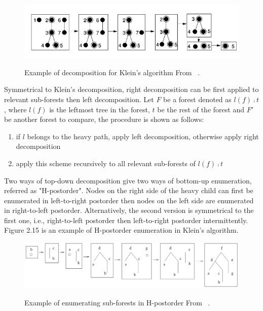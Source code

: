 \begin{figure}
		\centering
		\includegraphics[width=12cm,clip]{Figures/KleinAlgorithmExample}
		\label{Example of Decomposition for Klein's Algorithm} 
		\caption{Example of decomposition for Klein's algorithm From ~\cite{klein1998computing}.}
\end{figure}

Symmetrical to Klein's decomposition, right decomposition can be first applied to relevant sub-forests then left decomposition. Let $F$ be a forest denoted as $l(f) \comp t$, where $l(f)$ is the leftmost tree in the forest, $t$ be the rest of the forest and $F'$ be another forest to compare, the procedure is shown as follows:

\begin{enumerate}
\item if $l$ belongs to the heavy path, apply left decomposition, otherwise apply right decomposition
\item apply this scheme recursively to all relevant sub-forests of $l(f) \comp t$
\end{enumerate} 

Two ways of top-down decomposition give two ways of bottom-up enumeration, referred as  "H-postorder". Nodes on the right side of the heavy child can first be enumerated in left-to-right postorder then nodes on the left side are enumerated in right-to-left postorder. Alternatively, the second version is symmetrical to the first one, i.e., right-to-left postorder then left-to-right postorder intermittently. Figure 2.15 is an example of H-postorder enumeration in Klein's algorithm.

\begin{figure}
		\centering
		\includegraphics[width=12cm,clip]{Figures/HPostoderEnumeration}
		\label{Example of Enumerating Sub-forests in H-postorder} 
		\caption{Example of enumerating sub-forests in H-postorder From ~\cite{chen2015review}.}
\end{figure}

